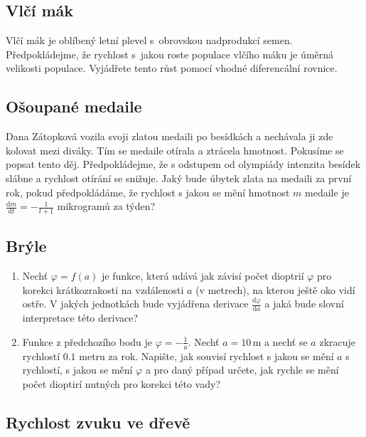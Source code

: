 \subsection{Vlčí mák}
Vlčí mák je oblíbený letní plevel
  s obrovskou nadprodukcí
  semen. Předpokládejme, že rychlost
  s jakou roste populace vlčího máku je
  úměrná velikosti populace. Vyjádřete
  tento růst pomocí vhodné diferencální
  rovnice.

  \subsection{Ošoupané medaile}

  Dana Zátopková vozila svoji zlatou medaili po besídkách a nechávala ji
    zde kolovat mezi diváky. Tím se medaile otírala a ztrácela hmotnost. Pokusíme
    se popsat tento děj. Předpokládejme, že s odstupem od olympiády intenzita
    besídek slábne a rychlost otírání se snižuje. Jaký bude úbytek zlata na
    medaili za první rok, pokud předpokládáme, že rychlost s jakou se mění
    hmotnost $m$ medaile je $\frac{\mathrm d m}{\mathrm dt}=-\frac{1}{t+1}$
    mikrogramů za týden?

    \subsection{Brýle}

    \begin{enumerate}
 \item Nechť $\varphi=f(a)$ je funkce, která
  udává jak závisí počet dioptrií $\varphi$ pro
  korekci krátkozrakosti na vzdálenosti $a$
  (v metrech), na kterou ještě oko vidí
  ostře. V jakých jednotkách bude
  vyjádřena derivace
  $\frac{\mathrm d\varphi}{\mathrm da}$ a jaká
  bude slovní interpretace této derivace?
\item Funkce z předchozího bodu je
  $\varphi=-\frac 1a$. Nechť $a=10\,\mathrm m$
  a nechť se $a$ zkracuje rychlostí $0.1$
  metru za rok. Napište, jak souvisí rychlost s jakou se mění $a$ s rychlostí, s jakou se mění $\varphi$ a pro daný případ určete, jak rychle se mění počet
  dioptirí nutných pro korekci této vady?

\end{enumerate}



\subsection{Rychlost zvuku ve dřevě}

